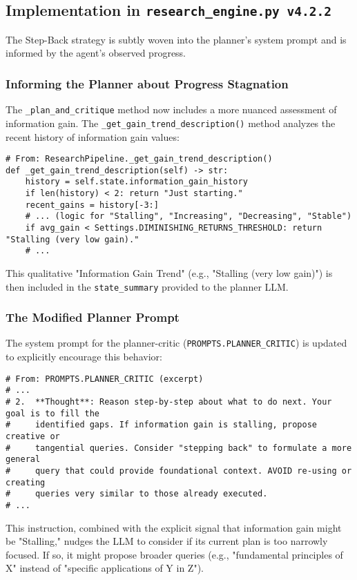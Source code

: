 \documentclass[12pt, a4paper]{article}
\begin{document}
\subsection{Implementation in \texttt{research\_engine.py v4.2.2}}
The Step-Back strategy is subtly woven into the planner's system prompt and is informed by the agent's observed progress.

\subsubsection{Informing the Planner about Progress Stagnation}
The \verb|_plan_and_critique| method now includes a more nuanced assessment of information gain. The \verb|_get_gain_trend_description()| method analyzes the recent history of information gain values:
\begin{lstlisting}[style=myPython]
# From: ResearchPipeline._get_gain_trend_description()
def _get_gain_trend_description(self) -> str:
    history = self.state.information_gain_history
    if len(history) < 2: return "Just starting."
    recent_gains = history[-3:]
    # ... (logic for "Stalling", "Increasing", "Decreasing", "Stable")
    if avg_gain < Settings.DIMINISHING_RETURNS_THRESHOLD: return "Stalling (very low gain)."
    # ...
\end{lstlisting}
This qualitative "Information Gain Trend" (e.g., "Stalling (very low gain)") is then included in the \verb|state_summary| provided to the planner LLM.

\subsubsection{The Modified Planner Prompt}
The system prompt for the planner-critic (\verb|PROMPTS.PLANNER_CRITIC|) is updated to explicitly encourage this behavior:
\begin{lstlisting}[style=myPython]
# From: PROMPTS.PLANNER_CRITIC (excerpt)
# ...
# 2.  **Thought**: Reason step-by-step about what to do next. Your goal is to fill the
#     identified gaps. If information gain is stalling, propose creative or
#     tangential queries. Consider "stepping back" to formulate a more general
#     query that could provide foundational context. AVOID re-using or creating
#     queries very similar to those already executed.
# ...
\end{lstlisting}
This instruction, combined with the explicit signal that information gain might be "Stalling," nudges the LLM to consider if its current plan is too narrowly focused. If so, it might propose broader queries (e.g., "fundamental principles of X" instead of "specific applications of Y in Z").
\end{document}
